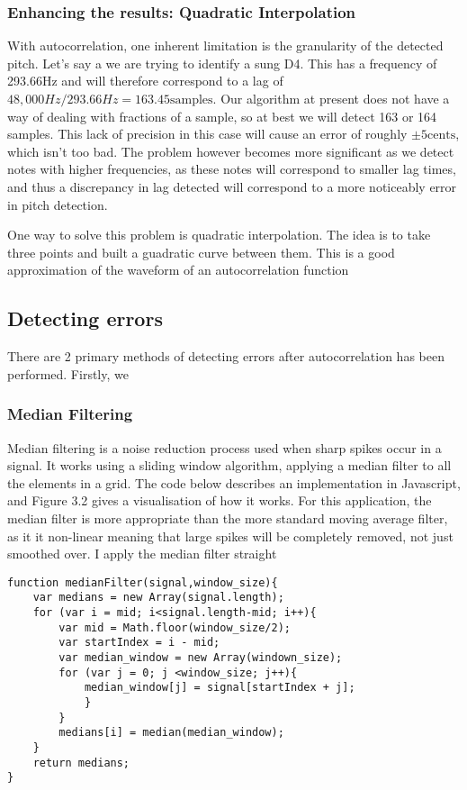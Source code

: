 \subsubsection{Enhancing the results: Quadratic Interpolation}
With autocorrelation, one inherent limitation is the granularity of the detected pitch.
Let's say a we are trying to identify a sung D4. This has a frequency of 293.66Hz and will therefore correspond to a lag of \(48,000Hz/293.66Hz = 163.45 \text{samples}\). Our algorithm at present does not have a way of dealing with fractions of a sample, so at best we will detect 163 or 164 samples. This lack of precision in this case will cause an error of roughly \(\pm 5 \text{cents}\), which isn't too bad. The problem however becomes more significant as we detect notes with higher frequencies, as these notes will correspond to smaller lag times, and thus a discrepancy in lag detected will correspond to a more noticeably error in pitch detection.

One way to solve this problem is quadratic interpolation. The idea is to take three points and built a guadratic curve between them. This is a good approximation of the waveform of an autocorrelation function



\subsection{Detecting errors}
There are 2 primary methods of detecting errors after autocorrelation has been performed.
Firstly, we		
\subsubsection{Median Filtering}
Median filtering is a noise reduction process used when sharp spikes occur in a signal. It works using a sliding window algorithm, applying a median filter to all the elements in a grid. The code below describes an implementation in Javascript, and Figure 3.2 gives a visualisation of how it works. 
For this application, the median filter is more appropriate than the more standard moving average filter, as it it non-linear meaning that large spikes will be completely removed, not just smoothed over.
I apply the median filter straight 
\begin{lstlisting}
function medianFilter(signal,window_size){
    var medians = new Array(signal.length);
    for (var i = mid; i<signal.length-mid; i++){
        var mid = Math.floor(window_size/2);
        var startIndex = i - mid;
        var median_window = new Array(windown_size);
        for (var j = 0; j <window_size; j++){
            median_window[j] = signal[startIndex + j];
            }
        }
        medians[i] = median(median_window);
    }
    return medians;
}
\end{lstlisting}

